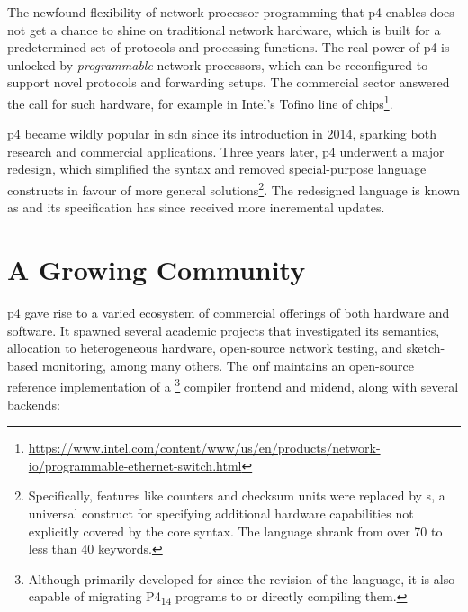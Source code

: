 The newfound flexibility of network processor programming that \acrshort{p4}
enables does not get a chance to shine on traditional network hardware, which is
built for a predetermined set of protocols and processing functions. The real
power of \acrshort{p4} is unlocked by \emph{programmable} network processors,
which can be reconfigured to support novel protocols and forwarding setups. The
commercial sector answered the call for such hardware, for example in Intel's
Tofino line of
chips\footnote{\url{https://www.intel.com/content/www/us/en/products/network-io/programmable-ethernet-switch.html}}.

\acrshort{p4} became wildly popular in \acrshort{sdn} since its introduction in
2014\cite{p4original}, sparking both research and commercial applications. Three
years later, \acrshort{p4} underwent a major redesign\cite{p416}, which
simplified the syntax and removed special-purpose language constructs in favour
of more general solutions\footnote{Specifically, features like counters and
checksum units were replaced by \extern{}s, a universal construct for specifying
additional hardware capabilities not explicitly covered by the core syntax. The
language shrank from over 70 to less than 40
keywords\cite{p416:v1:spec:comparison}.}. The redesigned language is known as
\pfs\cite{p416:v123:spec} and its specification has since received more
incremental updates.

\section*{A Growing Community}

\acrshort{p4} gave rise to a varied ecosystem of commercial offerings of both
hardware and software. It spawned several academic projects that investigated
its semantics\cite{doenges2021petr4}, allocation to heterogeneous
hardware\cite{sultana2021flightplan}, open-source network
testing\cite{antichi2014osnt}, and sketch-based
monitoring\cite{namkung2022sketchlib}, among many
others\cite{liatifis2023advancingp4survey}. The \acrfull{onf}
maintains\cite{p4onf} an open-source reference implementation of a
\pfs\footnote{Although primarily developed for \pfs since the revision of the
language, it is also capable of migrating P4\textsubscript{14} programs to \pfs
or directly compiling them.} compiler frontend and mid\-end, along with several
backends:

